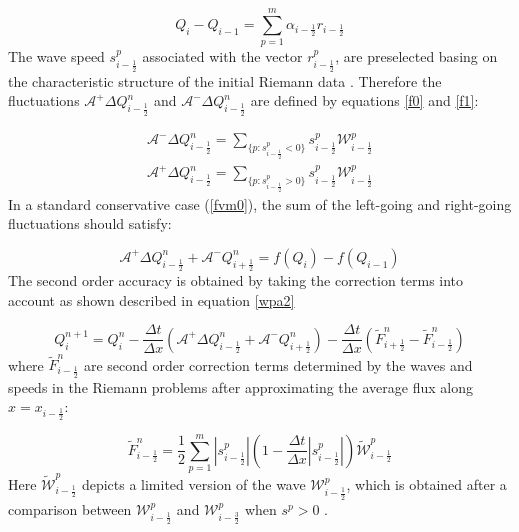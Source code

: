 \documentclass[11pt,a4paper]{article}
\newcommand{\donna}[1]{{\color{red}{#1}}}
\begin{document}
	\begin{equation}
		Q_{i} -  Q_{i-1} = \sum_{p=1}^{m}  \alpha_{i-\frac{1}{2}} r_{i-\frac{1}{2}}
		\label{wpa19}
	\end{equation}
	The wave speed $s_{i-\frac{1}{2}}^{p}$ associated with the vector $r_{i-\frac{1}{2}}^{p}$, are preselected basing on the characteristic structure of the initial Riemann data  \cite{ge:2008}. Therefore the fluctuations $\mathcal{A^{+}}\Delta Q_{i-\frac{1}{2}}^{n}$  and $\mathcal{A^{-}}\Delta Q_{i-\frac{1}{2}}^{n} $ are defined by equations \eqref{f0} and \eqref{f1}:
	
	\begin{eqnarray}
		\mathcal{A^{-}}\Delta Q_{i-\frac{1}{2}}^{n} = \sum_{\{ p:s_{i-\frac{1}{2}}^{p}<0\}} s_{i-\frac{1}{2}}^{p} \mathcal{W}_{i-\frac{1}{2}}^{p}
		\label{f0}\\
		\mathcal{A^{+}}\Delta Q_{i-\frac{1}{2}}^{n} =\sum_{\{ p:s_{i-\frac{1}{2}}^{p}>0\}} s_{i-\frac{1}{2}}^{p} \mathcal{W}_{i-\frac{1}{2}}^{p}
		\label{f1}
	\end{eqnarray}
	In a standard  conservative case (\eqref{fvm0}), the sum of the left-going and right-going fluctuations should satisfy:
	
	\begin{equation}
		\mathcal{A^{+}}\Delta 	Q_{i-\frac{1}{2}}^{n} + \mathcal{A^{-}}Q_{i+\frac{1}{2}}^{n} = f(Q_{i}) - f(Q_{i-1})
	\end{equation}
	The second order accuracy is obtained by taking the correction terms into account as shown described in equation \eqref{wpa2} \cite{barzgaran2019numerical}
	
	\begin{equation}
		Q_{i}^{n+1} =  Q_{i}^{n} - \frac{\Delta t}{\Delta x}(\mathcal{A^{+}}\Delta 	Q_{i-\frac{1}{2}}^{n} + \mathcal{A^{-}}Q_{i+\frac{1}{2}}^{n}) -  \frac{\Delta t}{\Delta x} (\tilde{F}_{i+\frac{1}{2}}^{n} - \tilde{F}_{i-\frac{1}{2}}^{n} )
		\label{wpa2}
	\end{equation}
	where $\tilde{F}_{i-\frac{1}{2}}^{n} $ are second order correction terms determined by the waves and speeds in the Riemann problems after approximating the average flux along  $x = x_{i - \frac{1}{2}}$:
	
	\begin{equation}
		\tilde{F}_{i-\frac{1}{2}}^{n} = \frac{1}{2} \sum_{p=1}^{m}  |s_{i- \frac{1}{2}}^{p}| \left( 1 - \frac{\Delta t}{\Delta x} |s_{i- \frac{1}{2}}^{p}|\right) \tilde{\mathcal{W}}_{i-\frac{1}{2}}^{p} 
		\label{wpa13}
	\end{equation}
	Here $\tilde{\mathcal{W}}_{i-\frac{1}{2}}^{p} $ depicts a limited version of the wave $\mathcal{W}_{i-\frac{1}{2}}^{p} $, which is obtained after a comparison between $\mathcal{W}_{i-\frac{1}{2}}^{p} $ and $\mathcal{W}_{i-\frac{3}{2}}^{p} $ when $s^{p} >0$ \cite{ba-le-mi-ro:2003}.\\
	
\end{document}

